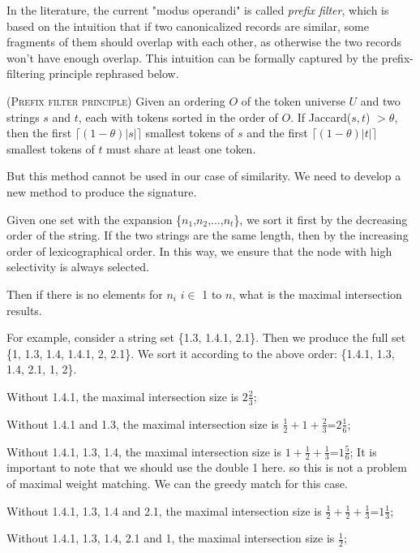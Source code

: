 In the literature, the current "modus operandi" is called \textit{prefix filter}, which is based on the intuition that if two canonicalized records are similar, some fragments of them should overlap with each other, as otherwise the two records
won't have enough overlap. This intuition can be formally captured by the prefix-filtering
principle \cite{conf/icde/ChaudhuriGK06} rephrased below.

\begin{lem} (\textsc{Prefix filter principle}) \cite{conf/icde/ChaudhuriGK06} Given an
ordering $O$ of the token universe $U$ and two strings $s$ and $t$, each with tokens sorted in the
order of $O$.   If Jaccard($s, t$) $> \theta$, then the first $\lceil(1-\theta)|s|\rceil$ smallest
tokens of $s$ and the first $\lceil(1-\theta)|t|\rceil$ smallest
tokens of $t$  must share at least one token.
\end{lem}

But this method cannot be used in our case of similarity. We need to develop a new method to produce the signature.

Given one set with the expansion \{$n_1$,$n_2$,...,$n_t$\}, we sort it first by the decreasing order of the string. If the two strings are the same length, then by the increasing order of lexicographical order. In this way, we ensure that the node with high selectivity is always selected.

Then if there is no elements for $n_i$ $ i \in $ 1 to $n$, what is the maximal intersection results.

For example, consider a string set \{1.3, 1.4.1, 2.1\}. Then we produce the full set \{1, 1.3, 1.4, 1.4.1, 2, 2.1\}. We sort it according to the above order: \{1.4.1, 1.3, 1.4, 2.1, 1, 2\}.

Without 1.4.1, the maximal intersection size is $2\frac{2}{3}$;

Without 1.4.1 and 1.3, the maximal intersection size is $\frac{1}{2}+1+\frac{2}{3}$=$2\frac{1}{6}$;

Without 1.4.1, 1.3, 1.4, the maximal intersection size is $1+\frac{1}{2}+\frac{1}{3}$=$1\frac{5}{6}$; It is important to note that we should use the double 1 here. so this is not a problem of maximal weight matching. We can the greedy match for this case.

Without 1.4.1, 1.3, 1.4 and 2.1, the maximal intersection size is $\frac{1}{2}+\frac{1}{2}+\frac{1}{3}$=$1\frac{1}{3}$;

Without 1.4.1, 1.3, 1.4, 2.1 and 1, the maximal intersection size is $\frac{1}{2}$;

